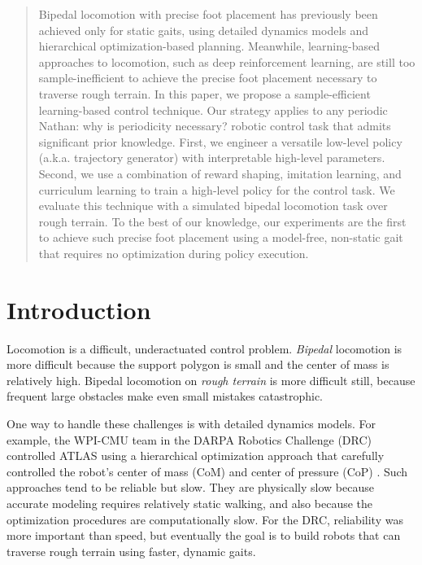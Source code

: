 \documentclass[conference]{IEEEtran}
\newcommand{\nhatch}[1]{{\leavevmode\color{magenta} Nathan: #1}}
\begin{document}
\begin{abstract}
  Bipedal locomotion with precise foot placement has previously been achieved only for static gaits, using detailed dynamics models and hierarchical optimization-based planning.
  Meanwhile, learning-based approaches to locomotion, such as deep reinforcement learning, are still too sample-inefficient to achieve the precise foot placement necessary to traverse rough terrain.
  In this paper, we propose a sample-efficient learning-based control technique.
  Our strategy applies to any periodic \nhatch{why is periodicity necessary?} robotic control task that admits significant prior knowledge.
  First, we engineer a versatile low-level policy (a.k.a. trajectory generator) with interpretable high-level parameters.
  Second, we use a combination of reward shaping, imitation learning, and curriculum learning to train a high-level policy for the control task.
  We evaluate this technique with a simulated bipedal locomotion task over rough terrain.
  To the best of our knowledge, our experiments are the first to achieve such precise foot placement
  using a model-free, non-static gait that requires no optimization during policy execution.
\end{abstract}

\IEEEpeerreviewmaketitle


\section{Introduction} \label{sec:intro}

Locomotion is a difficult, underactuated control problem.
\emph{Bipedal} locomotion is more difficult because the support polygon is small and the center of mass is relatively high.
Bipedal locomotion on \emph{rough terrain} is more difficult still, because frequent large obstacles make even small mistakes catastrophic.

One way to handle these challenges is with detailed dynamics models.
For example, the WPI-CMU team in the DARPA Robotics Challenge (DRC) controlled ATLAS using a hierarchical optimization approach that carefully controlled the robot's center of mass (CoM) and center of pressure (CoP) \citep{feng2015optimization}.
Such approaches tend to be reliable but slow.
They are physically slow because accurate modeling requires relatively static walking, and also because the optimization procedures are computationally slow.
For the DRC, reliability was more important than speed, but eventually the goal is to build robots that can traverse rough terrain using faster, dynamic gaits.
\end{document}
